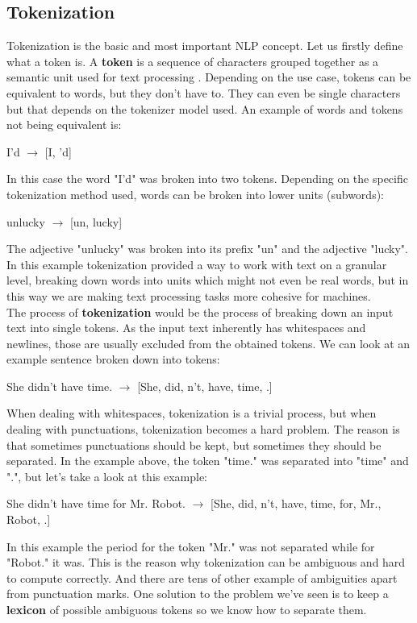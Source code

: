 \documentclass[12pt]{article}
\numberwithin{equation}{section}
\begin{document}
\begin{spacing}{1.5}
	\subsection{Tokenization}
	Tokenization is the basic and most important NLP concept. Let us firstly define what a token is. A \textbf{token} is a sequence of characters grouped together as a semantic unit used for text processing \cite{stanford_NLP}. Depending on the use case,  tokens can be equivalent to words, but they don't have to. They can even be single characters but that depends on the tokenizer model used. An example of words and tokens not being equivalent is:
	\begin{center}
		I'd $\rightarrow$ [I, 'd]
	\end{center}
	In this case the word "I'd" was broken into two tokens. Depending on the specific tokenization method used, words can be broken into lower units (subwords):
	\begin{center}
		unlucky $\rightarrow$ [un, lucky]
	\end{center}
	The adjective "unlucky" was broken into its prefix "un" and the adjective "lucky". In this example tokenization provided a way to work with text on a granular level, breaking down words into units which might not even be real words, but in this way we are making text processing tasks more cohesive for machines. \\
	The process of \textbf{tokenization} would be the process of breaking down an input text into single tokens. As the input text inherently has whitespaces and newlines, those are usually excluded from the obtained tokens. We can look at an example sentence broken down into tokens: 
	\begin{center}
		She didn't have time. $\rightarrow$ [She, did, n't, have, time, .]
	\end{center}
	When dealing with whitespaces, tokenization is a trivial process, but when dealing with punctuations, tokenization becomes a hard problem. The reason is that sometimes punctuations should be kept, but sometimes they should be separated. In the example above, the token "time." was separated into "time" and ".", but let's take a look at this example:
	\begin{center}
		She didn't have time for Mr. Robot. $\rightarrow$ [She, did, n't, have, time, for, Mr., Robot, .]
	\end{center}
	In this example the period for the token "Mr." was not separated while for "Robot." it was. This is the reason why tokenization can be ambiguous and hard to compute correctly. And there are tens of other example of ambiguities apart from punctuation marks. One solution to the problem we've seen is to keep a \textbf{lexicon} of possible ambiguous tokens so we know how to separate them.
	

\end{spacing}
\end{document}

